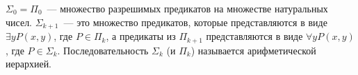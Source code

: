 $\Sigma_0 = \Pi_0$~--- множество разрешимых предикатов на множестве натуральных чисел. $\Sigma_{k + 1}$~--- это множество
предикатов, которые представляются в виде $\exists y P(x,y)$, где $P \in \Pi_{k}$, а предикаты из $\Pi_{k + 1}$
представляются в виде $\forall y P(x, y)$, где $P \in \Sigma_{k}$. Последовательность $\Sigma_k$ (и $\Pi_k$) называется
арифметической иерархией.